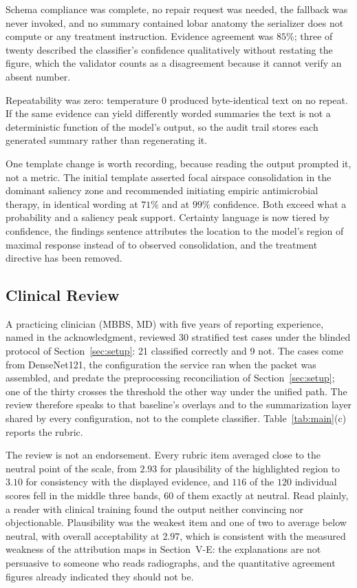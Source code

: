 \documentclass[conference]{IEEEtran}
\begin{document}
Schema compliance was complete, no repair request was needed, the fallback
was never invoked, and no summary contained lobar anatomy the serializer
does not compute or any treatment instruction. Evidence agreement was
$85\%$; three of twenty
described the classifier's confidence qualitatively without restating the
figure, which the validator counts as a disagreement because it cannot
verify an absent number.

Repeatability was zero: temperature $0$ produced byte-identical text on no
repeat. If the same evidence can yield differently worded summaries the text
is not a deterministic function of the model's output, so the audit trail
stores each generated summary rather than regenerating it.

One template change is worth recording, because reading the output prompted
it, not a metric. The initial template asserted focal airspace consolidation
in the dominant saliency zone and recommended initiating empiric
antimicrobial therapy, in identical wording at $71\%$ and at $99\%$
confidence. Both exceed what a probability and a saliency peak support.
Certainty language is now tiered by confidence, the findings sentence
attributes the location to the model's region of maximal response instead of
to observed consolidation, and the treatment directive has been removed.

\subsection{Clinical Review}
\label{sec:review}
A practicing clinician (MBBS, MD) with five years of reporting experience,
named in the acknowledgment, reviewed 30 stratified test cases under the
blinded protocol of Section~\ref{sec:setup}: 21 classified correctly and 9
not. The cases come from DenseNet121, the configuration the service ran when the
packet was assembled, and predate the preprocessing reconciliation of
Section~\ref{sec:setup}; one of the thirty crosses the threshold the other
way under the unified path.
The review therefore speaks to that baseline's overlays and to the
summarization layer shared by every configuration, not to the complete
classifier.
Table~\ref{tab:main}(c) reports the rubric.

The review is not an endorsement. Every rubric item averaged close to the
neutral point of the scale, from $2.93$ for plausibility of the highlighted
region to $3.10$ for consistency with the displayed evidence, and $116$ of
the $120$ individual scores fell in the middle three bands, $60$ of them
exactly at neutral. Read plainly, a reader with clinical training found the
output neither convincing nor objectionable. Plausibility was the weakest
item and one of two to average below neutral, with overall acceptability at
$2.97$, which is consistent with the measured weakness of the attribution maps in
Section~V-E: the explanations are not persuasive to someone who reads
radiographs, and the quantitative agreement figures already indicated they
should not be.
\end{document}
